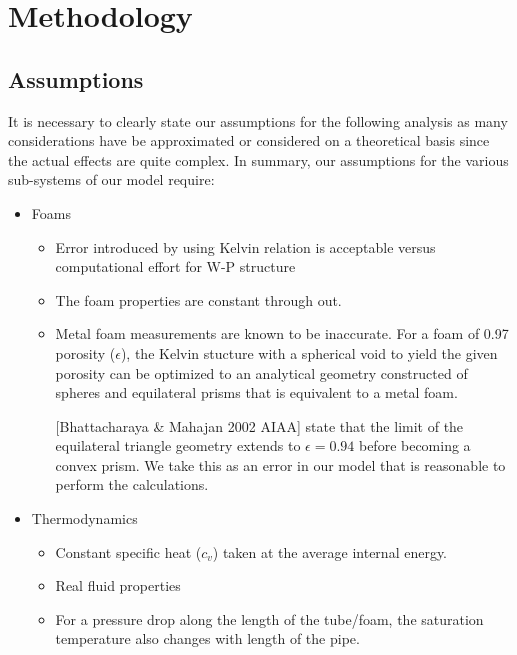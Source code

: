 \documentclass[compileTAMUreport.tex]{subfiles}
\begin{document}
\section{Methodology}

\subsection{Assumptions}

It is necessary to clearly state our assumptions for the following analysis as many considerations have be approximated or considered on a theoretical basis since the actual effects are quite complex. 
In summary, our assumptions for the various sub-systems of our model require:
\begin{itemize} %
	\item Foams
		\begin{itemize}
			\item 	Error introduced by using Kelvin relation is acceptable versus computational effort for W-P structure
			\item The foam properties are constant through out.
			\item	Metal foam measurements are known to be inaccurate. 
			For a foam of 0.97 porosity ($\epsilon$), the Kelvin stucture with a spherical void to yield the given porosity can be optimized to an analytical geometry constructed of spheres and equilateral prisms that is equivalent to a metal foam.
			 
			[Bhattacharaya 		\& Mahajan 2002 AIAA] state that the limit of the equilateral triangle geometry extends to $\epsilon = 0.94$ before becoming a convex prism. 
			We take this as an error in our model that is reasonable to perform the calculations.\cite{Bhattacharya2002}
		\end{itemize}

	\item Thermodynamics
		\begin{itemize}
			\item	Constant specific heat ($c_v$) taken at the average internal energy.
			\item 	Real fluid properties
			\item 	For a pressure drop along the length of the tube/foam, the saturation temperature also changes with length of the pipe.
		\end{itemize}


\end{itemize}
\end{document}
